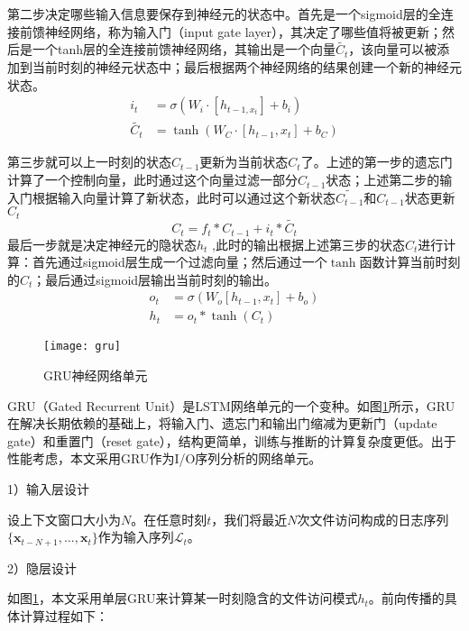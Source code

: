 第二步决定哪些输入信息要保存到神经元的状态中。首先是一个sigmoid层的全连接前馈神经网络，称为输入门（input gate layer），其决定了哪些值将被更新；然后是一个tanh层的全连接前馈神经网络，其输出是一个向量$\tilde{C_t}$，该向量可以被添加到当前时刻的神经元状态中；最后根据两个神经网络的结果创建一个新的神经元状态。
\begin{align}
    i_t &= \sigma(W_i \cdot [h_{t-1,x_t}]+b_i) \\
    \tilde{C_t} &= \tanh(W_C \cdot [h_{t-1},x_t]+b_C)
\end{align}

第三步就可以上一时刻的状态$C_{t−1}$更新为当前状态$C_t$了。上述的第一步的遗忘门计算了一个控制向量，此时通过这个向量过滤一部分$C_{t-1}$状态；上述第二步的输入门根据输入向量计算了新状态，此时可以通过这个新状态$\tilde{C_{t-1}}$和$C_{t−1}$状态更新$C_t$
\begin{equation}
    C_t = f_t*C_{t-1} + i_t*\tilde{C_t}
\end{equation}
​	
最后一步就是决定神经元的隐状态$h_t$	,此时的输出根据上述第三步的状态$C_t$进行计算：首先通过sigmoid层生成一个过滤向量；然后通过一个$\tanh$函数计算当前时刻的$C_t$；最后通过sigmoid层输出当前时刻的输出。
\begin{align}
    o_t &= \sigma(W_o [h_{t-1},x_t]+b_o) \\
    h_t &= o_t * \tanh(C_t)
\end{align}

\begin{figure}[htp]
\centering
\texttt{[image: gru]}
\caption{GRU神经网络单元}
\label{fig:gru}
\end{figure}

GRU（Gated Recurrent Unit）\cite{GRU}是LSTM网络单元的一个变种。如图\ref{fig:gru}所示，GRU在解决长期依赖的基础上，将输入门、遗忘门和输出门缩减为更新门（update gate）和重置门（reset gate），结构更简单，训练与推断的计算复杂度更低。出于性能考虑，本文采用GRU作为I/O序列分析的网络单元。




1）输入层设计

设上下文窗口大小为$N$。在任意时刻$t$，我们将最近$N$次文件访问构成的日志序列$\{\mathbf{x}_{t-N+1}, \dots, \mathbf{x}_t\}$作为输入序列$\mathcal{L}_t$。

2）隐层设计

如图\ref{fig:gru}，本文采用单层GRU来计算某一时刻隐含的文件访问模式$h_t$。前向传播的具体计算过程如下：

